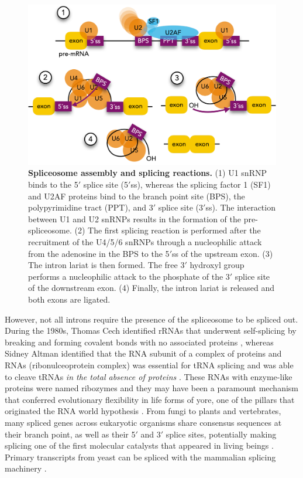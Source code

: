 \begin{figure}[!h]
  \centering
  \includegraphics[width=.5\linewidth]{images/intro/spliceosome-assembly}
  \caption[Spliceosome assembly and splicing reactions]{\textbf{Spliceosome assembly and splicing reactions.} (1) U1 snRNP binds to the 5$'$ splice site (5$'$ss), whereas the splicing factor 1 (SF1) and U2AF proteins bind to the branch point site (BPS), the polypyrimidine tract (PPT), and 3$'$ splice site (3$'$ss). The interaction between U1 and U2 snRNPs results in the formation of the pre-spliceosome. (2) The first splicing reaction is performed after the recruitment of the U4/5/6 snRNPs through a nucleophilic attack from the adenosine in the BPS to the 5$'$ss of the upstream exon. (3) The intron lariat is then formed. The free 3$'$ hydroxyl group performs a nucleophilic attack to the phosphate of the 3$'$ splice site of the downstream exon. (4) Finally, the intron lariat is released and both exons are ligated.}
\end{figure}

However, not all introns require the presence of the spliceosome to be spliced out. During the 1980s, Thomas Cech identified rRNAs that underwent self-splicing by breaking and forming covalent bonds with no associated proteins \cite{kruger:1982wk}, whereas Sidney Altman identified that the RNA subunit of a complex of proteins and RNAs (ribonulceoprotein complex) was essential for tRNA splicing and was able to cleave tRNAs \emph{in the total absence of proteins} \cite{altman:1986wp}. These RNAs with enzyme-like proteins were named ribozymes and they may have been a paramount mechanism that conferred evolutionary flexibility in life forms of yore, one of the pillars that originated the RNA world hypothesis \cite{kruger:1982wk,gilbert:1986td}. From fungi to plants and vertebrates, many spliced genes across eukaryotic organisms share consensus sequences at their branch point, as well as their 5$'$ and 3$'$ splice sites, potentially making splicing one of the first molecular catalysts that appeared in living beings \cite{sharp:1985th}. Primary transcripts from yeast can be spliced with the mammalian splicing machinery \cite{sharp:1985th}.


